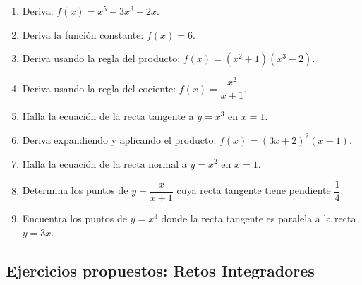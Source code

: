\documentclass[12pt, letterpaper]{article}
\begin{document}
\begin{enumerate}[resume=ejercicios, leftmargin=*]
  \item \facil{} Deriva: $f(x) = x^5 - 3x^3 + 2x$.

  \item \facil{} Deriva la función constante: $f(x) = 6$.

  \item \medio{} Deriva usando la regla del producto: $f(x) = (x^2 + 1)(x^3 - 2)$.

  \item \medio{} Deriva usando la regla del cociente: $f(x) = \dfrac{x^2}{x + 1}$.

  \item \medio{} Halla la ecuación de la recta tangente a $y = x^3$ en $x = 1$.

  \item \dificil{} Deriva expandiendo y aplicando el producto: $f(x) = (3x + 2)^2 (x - 1)$.

  \item \dificil{} Halla la ecuación de la recta normal a $y = x^2$ en $x = 1$.

  \item \dificil{} Determina los puntos de $y = \dfrac{x}{x + 1}$ cuya recta tangente tiene pendiente $\dfrac{1}{4}$.

  \item \muyDificil{} Encuentra los puntos de $y = x^3$ donde la recta tangente es paralela a la recta $y = 3x$.
\end{enumerate}

\subsection{Ejercicios propuestos: Retos Integradores}
\end{document}
